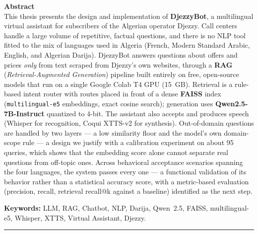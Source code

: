 \documentclass[12pt, a4paper]{report}
\begin{document}
\textbf{Abstract}\\[0.3cm]
This thesis presents the design and implementation of \textbf{DjezzyBot}, a multilingual virtual assistant for subscribers of the Algerian operator Djezzy. Call centers handle a large volume of repetitive, factual questions, and there is no NLP tool fitted to the mix of languages used in Algeria (French, Modern Standard Arabic, English, and Algerian Darija). DjezzyBot answers questions about offers and prices \emph{only} from text scraped from Djezzy's own websites, through a \textbf{RAG} (\textit{Retrieval-Augmented Generation}) pipeline built entirely on free, open-source models that run on a single Google Colab T4 GPU (15~GB). Retrieval is a rule-based intent router with \numRoutes{} routes placed in front of a dense \textbf{FAISS} index (\texttt{multilingual-e5} embeddings, exact cosine search); generation uses \textbf{Qwen2.5-7B-Instruct} quantized to 4-bit. The assistant also accepts and produces speech (Whisper for recognition, Coqui XTTS-v2 for synthesis). Out-of-domain questions are handled by two layers --- a low similarity floor and the model's own domain-scope rule --- a design we justify with a calibration experiment on about 95 queries, which shows that the embedding score alone cannot separate real questions from off-topic ones. Across \numTestsTotal{} behavioral acceptance scenarios spanning the four languages, the system passes every one --- a functional validation of its behavior rather than a statistical accuracy score, with a metric-based evaluation (precision, recall, retrieval recall@k against a baseline) identified as the next step.

\textbf{Keywords:} LLM, RAG, Chatbot, NLP, Darija, Qwen~2.5, FAISS, multilingual-e5, Whisper, XTTS, Virtual Assistant, Djezzy.

\vspace{0.7cm}
\noindent\rule{\textwidth}{0.4pt}
\vspace{0.5cm}
\end{document}

